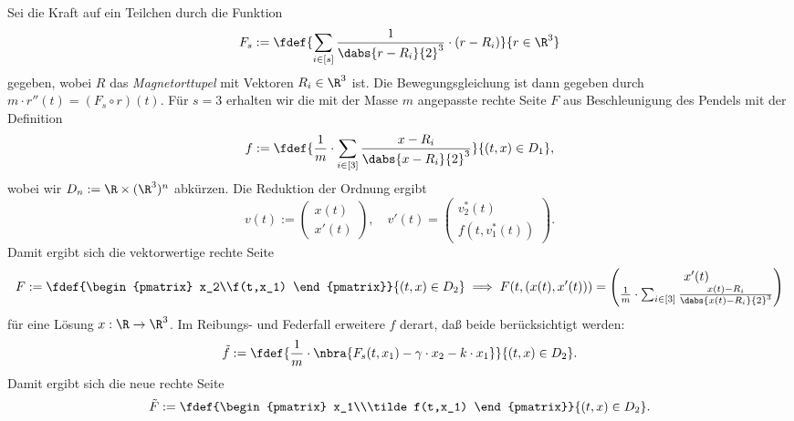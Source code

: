 \documentclass[
    oneside,
    ngerman,
    footinclude=false,
    captions=tableheading,
    DIV=12
]{scrartcl}
\begin{document}
\aufgabe{}
\subaufgabe{}
    Sei die Kraft auf ein Teilchen durch die Funktion
    \[F_s:=\fdef{\sum_{i\in[s]}\frac{1}{\dabs{r - R_i}{2}^3}\cdot (r-R_i)}{r\in\R^3}\]
    gegeben, wobei $R$ das \emph{Magnetorttupel} mit Vektoren $R_i\in\R^3$ ist. Die Bewegungsgleichung ist dann gegeben durch $m\cdot r''(t) = (F_s\circ r)(t)$. Für $s = 3$ erhalten wir die mit der Masse $m$ angepasste rechte Seite $F$ aus Beschleunigung des Pendels mit der Definition
    \[f:=\fdef{\frac{1}{m}\cdot\sum_{i\in[3]}\frac{x-R_i}{\dabs{x-R_i}{2}^3}}{(t,x)\in D_1},\]
    wobei wir $D_n:=\R\times(\R^3)^n$ abkürzen. Die Reduktion der Ordnung ergibt
    \[v(t):=\begin{pmatrix}
        x(t)\\x'(t)
    \end{pmatrix},\quad v'(t)=\begin{pmatrix}
        v_2^*(t)\\f(t,v_1^*(t))
    \end{pmatrix}.\]
    Damit ergibt sich die vektorwertige rechte Seite
    \[F:=\fdef{\begin{pmatrix}
        x_2\\f(t,x_1)
    \end{pmatrix}}{(t,x)\in D_2}\implies F(t,(x(t),x'(t))) = \begin{pmatrix}
        x'(t)\\\frac{1}{m}\cdot\sum_{i\in[3]}\frac{x(t)-R_i}{\dabs{x(t)-R_i}{2}^3}
    \end{pmatrix}\]
    für eine Lösung $x:\R\to \R^3$. Im Reibungs- und Federfall erweitere $f$ derart, daß beide berücksichtigt werden:
    \[\tilde f:=\fdef{\frac{1}{m}\cdot \nbra{F_s(t,x_1) - \gamma\cdot x_2 - k\cdot x_1}}{(t,x)\in D_2}.\]
    Damit ergibt sich die neue rechte Seite
    \[\tilde F:=\fdef{\begin{pmatrix}
        x_1\\\tilde f(t,x_1)
    \end{pmatrix}}{(t,x)\in D_2}.\]
\end{document}
